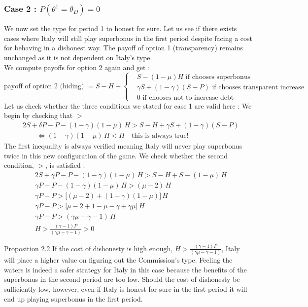\documentclass{article}
\begin{document}
\subsubsection*{Case 2 : $P(\theta^1=\theta_D)=0$}
We now set the type for period 1 to honest for sure. Let us see if there exists cases where Italy will still play superbonus in the first period despite facing a cost for behaving in a dishonest way.
The payoff of option 1 (transparency) remains unchanged as it is not dependent on Italy's type. \\
We compute payoffs for option 2 again and get : 
\begin{equation}
\text{payoff of option 2 (hiding) }=S-H+
\left\{
\begin{aligned}
     &S-(1-\mu)H \text{ if chooses superbonus}\\
     &\gamma S+ (1-\gamma)(S-P) \text{ if chooses transparent increase}\\
     &0 \text{ if chooses not to increase debt}
\end{aligned}
\right.
\end{equation}
Let us check whether the three conditions we stated for case 1 are valid here : We begin by checking that $>$
\begin{align*}  
&2S + \delta P - P - (1-\gamma)(1-\mu)\,H   
   > S - H + \gamma S + (1-\gamma)(S - P) \\[6pt]  
&\qquad\Leftrightarrow (1-\gamma)(1-\mu)\,H < H   
   \quad \text{this is always true!}  
\end{align*}
The first inequality is always verified meaning Italy will never play superbonus twice in this new configuration of the game. We check whether the second condition, $>$, is satisfied : 
\begin{align*}
&2S + \gamma P - P - (1-\gamma)(1-\mu)\,H   
   > S - H + S - (1-\mu)\,H \\[6pt]  
&\gamma P - P - (1-\gamma)(1-\mu)\,H   
   > (\mu - 2)\,H \\[6pt]  
&\gamma P - P   
   > \bigl[(\mu - 2) + (1-\gamma)(1-\mu)\bigr]\,H \\[6pt]  
&\gamma P - P   
   > \bigl[\mu - 2 + 1 - \mu - \gamma + \gamma\mu\bigr]\,H \\[6pt]  
&\gamma P - P   
   > (\gamma\mu - \gamma - 1)\,H  \\[6pt] 
& H>\frac{(\gamma-1)P}{(\gamma \mu-\gamma-1)}>0
\end{align*}  
\begin{simplebox}{Proposition 2.2}
If the cost of dishonesty is high enough, $H>\frac{(\gamma-1)P}{(\gamma \mu-\gamma-1)}$, Italy will place a higher value on figuring out the Commission's type. Feeling the waters is indeed a safer strategy for Italy in this case because the benefits of the superbonus in the second period are too low. Should the cost of dishonesty be sufficiently low, however, even if Italy is honest for sure in the first period it will end up playing superbonus in the first period.
\end{simplebox}
\end{document}
